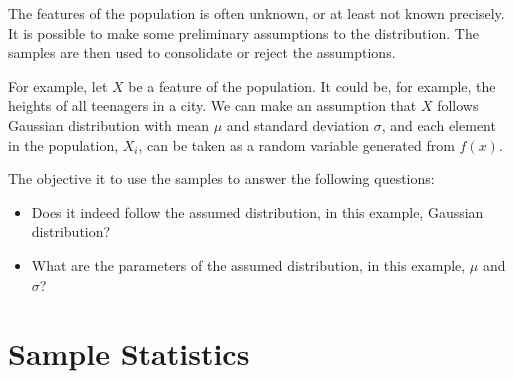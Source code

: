 The features of the population is often unknown, or at least not known precisely. It is possible to make some preliminary assumptions to the distribution. The samples are then used to consolidate or reject the assumptions.

For example, let $X$ be a feature of the population. It could be, for example, the heights of all teenagers in a city. We can make an assumption that $X$ follows Gaussian distribution with mean $\mu$ and standard deviation $\sigma$, and each element in the population, $X_i$, can be taken as a random variable generated from $f(x)$.

The objective it to use the samples to answer the following questions:
\begin{itemize}
  \item Does it indeed follow the assumed distribution, in this example, Gaussian distribution?
  \item What are the parameters of the assumed distribution, in this example, $\mu$ and $\sigma$?
\end{itemize}

\section{Sample Statistics}





